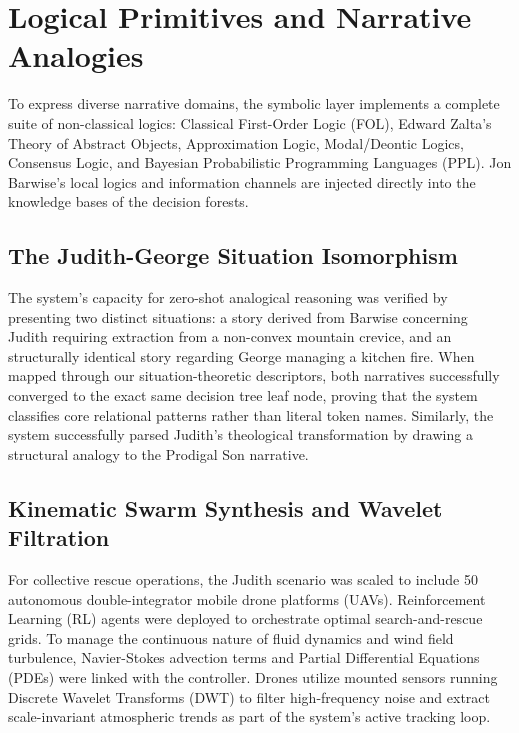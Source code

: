 \documentclass[11pt,fleqn]{article}
\begin{document}
\section{Logical Primitives and Narrative Analogies}
To express diverse narrative domains, the symbolic layer implements a complete suite of non-classical logics: Classical First-Order Logic (FOL), Edward Zalta's Theory of Abstract Objects, Approximation Logic, Modal/Deontic Logics, Consensus Logic, and Bayesian Probabilistic Programming Languages (PPL). Jon Barwise's local logics and information channels are injected directly into the knowledge bases of the decision forests.

\subsection{The Judith-George Situation Isomorphism}
The system's capacity for zero-shot analogical reasoning was verified by presenting two distinct situations: a story derived from Barwise concerning Judith requiring extraction from a non-convex mountain crevice, and an structurally identical story regarding George managing a kitchen fire. When mapped through our situation-theoretic descriptors, both narratives successfully converged to the exact same decision tree leaf node, proving that the system classifies core relational patterns rather than literal token names. Similarly, the system successfully parsed Judith's theological transformation by drawing a structural analogy to the Prodigal Son narrative.

\subsection{Kinematic Swarm Synthesis and Wavelet Filtration}
For collective rescue operations, the Judith scenario was scaled to include 50 autonomous double-integrator mobile drone platforms (UAVs). Reinforcement Learning (RL) agents were deployed to orchestrate optimal search-and-rescue grids. To manage the continuous nature of fluid dynamics and wind field turbulence, Navier-Stokes advection terms and Partial Differential Equations (PDEs) were linked with the controller. Drones utilize mounted sensors running Discrete Wavelet Transforms (DWT) to filter high-frequency noise and extract scale-invariant atmospheric trends as part of the system's active tracking loop.
\end{document}
